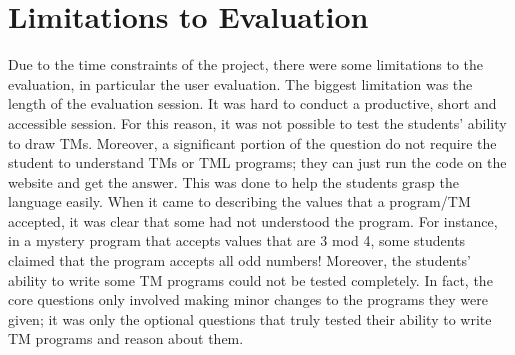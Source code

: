 \section{Limitations to Evaluation}
Due to the time constraints of the project, there were some limitations to the evaluation, in particular the user evaluation. The biggest limitation was the length of the evaluation session. It was hard to conduct a productive, short and accessible session. 
For this reason, it was not possible to test the students' ability to draw TMs. Moreover, a significant portion of the question do not require the student to understand TMs or TML programs; they can just run the code on the website and get the answer. This was done to help the students grasp the language easily. When it came to describing the values that a program/TM accepted, it was clear that some had not understood the program. For instance, in a mystery program that accepts values that are 3 mod 4, some students claimed that the program accepts all odd numbers!
Moreover, the students' ability to write some TM programs could not be tested completely. In fact, the core questions only involved making minor changes to the programs they were given; it was only the optional questions that truly tested their ability to write TM programs and reason about them. 


